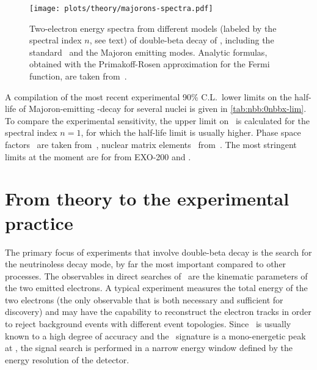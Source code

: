 \begin{figure}
  \centering
  \texttt{[image: plots/theory/majorons-spectra.pdf]}
  \caption{%
    Two-electron energy spectra from different models (labeled by the spectral index $n$,
    see text) of double-beta decay of \gesix, including the standard \nnbb\ and the
    Majoron emitting modes.  Analytic formulas, obtained with the Primakoff-Rosen
    approximation for the Fermi function, are taken
    from~\cite{Tretyak1995, Tretyak2002}.
  }\label{fig:nbb:majorons-spectra}
\end{figure}

A compilation of the most recent experimental 90\% C.L.~lower limits on the half-life of
Majoron-emitting \onbb-decay for several nuclei is given in \cref{tab:nbb:0nbbx-lim}. To
compare the experimental sensitivity, the upper limit on \ga\ is calculated for the spectral
index $n=1$, for which the half-life limit is usually higher. Phase space factors
\psfmajo\ are taken from~\cite{Kotila2015}, nuclear matrix elements \nmemajo\
from~\cite{Engel2017}. The most stringent limits at the moment are for  from
EXO-200 and \kamlandzen.

\begin{table}
  \centering
  \caption{%
    A compilation of the current 90\% C.L.~lower limits on Majoron-emitting \onbb\ modes
    as set by the \gerda, EXO-200, KamLAND-Zen and NEMO-3 experiments for different
    isotopes. The limit on the coupling constant \ga\ for $n=1$ is reported, as calculated
    with phase-space factors from~\cite{Kotila2015} and most up-to-date nuclear matrix
    elements~\cite{Engel2017}. \ga\ limits for the other indices and different models can
    be found in the references. Note that the limits on \ga\ reported here might differ
    from those found in the original publications.
  }\label{tab:nbb:0nbbx-lim}
  
\end{table}

\section{From theory to the experimental practice}%
\label{sec:nbb:exp}

The primary focus of experiments that involve double-beta decay is the search for the
neutrinoless decay mode, by far the most important compared to other processes. The
observables in direct searches of \onbb\ are the kinematic parameters of the two emitted
electrons. A typical experiment measures the total energy of the two electrons (the only
observable that is both necessary and sufficient for discovery) and may have the
capability to reconstruct the electron tracks in order to reject background events with
different event topologies. Since \qbb\ is usually known to a high degree of accuracy and
the \onbb\ signature is a mono-energetic peak at \qbb, the signal search is performed in a
narrow energy window defined by the energy resolution of the detector.

